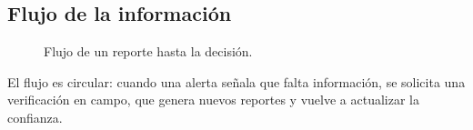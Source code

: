 \subsection{Flujo de la información}
\begin{figure}[H]
\centering

\caption{Flujo de un reporte hasta la decisión.}
\label{fig:flujo}
\end{figure}

El flujo es circular: cuando una alerta señala que falta información, se solicita una verificación en campo, que genera nuevos reportes y vuelve a actualizar la confianza.
